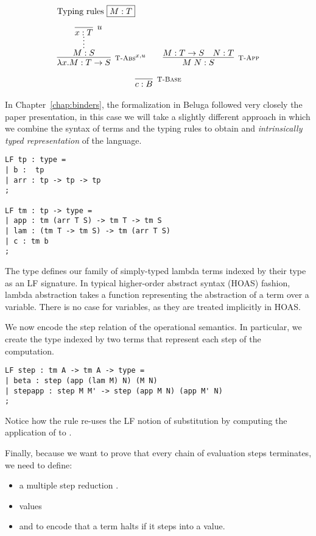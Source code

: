 \[
\begin{array}{c@{\qquad}c}
\multicolumn{2}{l}{\mbox{Typing rules \fbox{$M:T$}}} \\[1em]
\infer[\TFn^{x,u}]{\lam x.M : T \arrow S}
                 {\infer*{M:S}{\infer[u]{x:T}{}}} &
\infer[\TApp]{M\;N : S}{M : T \arrow S & N:T} \\[1em]
\multicolumn{2}{c}{\infer[\TBase]{c : B}{}}
\end{array}
\]

In Chapter~\ref{chap:binders}, the formalization in Beluga followed
very closely the paper presentation, in this case we will take a
slightly different approach in which we combine the syntax of terms
and the typing rules to obtain and \emph{intrinsically typed
  representation} of the language.

\begin{lstlisting}
LF tp : type =
| b :  tp
| arr : tp -> tp -> tp
;

LF tm : tp -> type =
| app : tm (arr T S) -> tm T -> tm S
| lam : (tm T -> tm S) -> tm (arr T S)
| c : tm b
;
\end{lstlisting}

The type  defines our family of simply-typed lambda terms
indexed by their type as an LF signature. In typical higher-order
abstract syntax (HOAS) fashion, lambda abstraction takes a function
representing the abstraction of a term over a variable. There is no
case for variables, as they are treated implicitly in HOAS.

We now encode the step relation of the operational semantics. In
particular, we create the  type indexed by two terms that
represent each step of the computation.

\begin{lstlisting}
LF step : tm A -> tm A -> type =
| beta : step (app (lam M) N) (M N)
| stepapp : step M M' -> step (app M N) (app M' N)
;
\end{lstlisting}

Notice how the  rule re-uses the LF notion of substitution by
computing the application of  to .

Finally, because we want to prove that every chain of evaluation steps
terminates, we need to define:
\begin{itemize}
\item a multiple step reduction .
\item values 
\item and  to encode that a term halts if it steps into a value.
\end{itemize}

